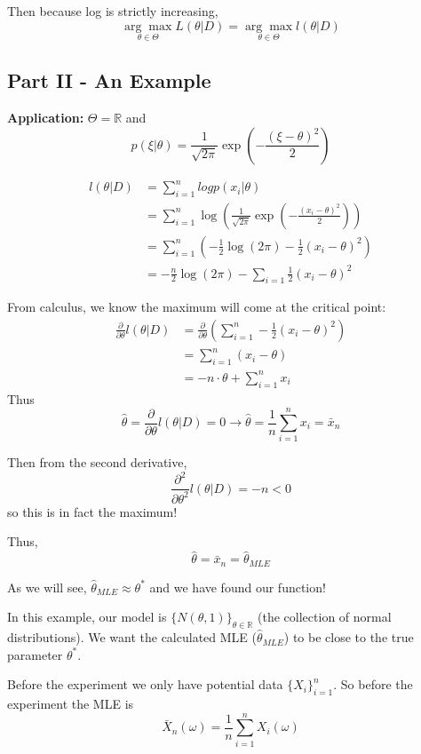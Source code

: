 \documentclass[12pt]{article}
\newcommand{\R}{\mathbb{R}}
\begin{document}
Then because log is strictly increasing, 
\[\underset{\theta \in \Theta}{\arg \max} L(\theta | D) = \underset{\theta \in \Theta}{\arg \max} l(\theta | D)\]

\subsection*{Part II - An Example}
\textbf{Application:} $\Theta = \R$ and 
\[p(\xi | \theta) = \frac{1}{\sqrt{2\pi}} \exp(- \frac{(\xi - \theta)^2}{2})\]

\begin{align*}
    l(\theta | D) &= \sum_{i=1}^n log p(x_i | \theta)\\
    &= \sum_{i=1}^n \log\left(\frac{1}{\sqrt{2\pi}} \exp(- \frac{(x_i - \theta)^2}{2})\right)\\
    &= \sum_{i=1}^n \left(-\frac{1}{2}\log(2\pi) - \frac{1}{2}(x_i - \theta)^2\right)\\
    &= -\frac{n}{2}\log(2\pi) - \sum_{i=1}\frac{1}{2}(x_i - \theta)^2
\end{align*}

From calculus, we know the maximum will come at the critical point: 
\begin{align*}
    \frac{\partial}{\partial \theta} l(\theta | D) &= \frac{\partial}{\partial \theta} \left(\sum_{i=1}^n -\frac{1}{2}(x_i - \theta)^2\right)\\
    &= \sum_{i=1}^n (x_i - \theta)\\
    &= -n \cdot \theta + \sum_{i=1}^n x_i
\end{align*}
Thus 
\[\hat \theta =  \frac{\partial}{\partial \theta} l(\theta | D) = 0 \longrightarrow \hat \theta = \frac{1}{n}\sum_{i=1}^n x_i = \bar{x}_n\]

Then from the second derivative, 
\[\frac{\partial^2}{\partial \theta^2} l(\theta | D) = -n < 0\]
so this is in fact the maximum!

Thus,
\[\hat \theta = \bar{x}_n = \hat \theta_{MLE}\]

As we will see, $\hat \theta_{MLE} \approx \theta^*$ and we have found our function!

In this example, our model is $\{N(\theta, 1)\}_{\theta \in \R}$ (the collection of normal distributions). We want the calculated MLE ($\hat \theta_{MLE}$) to be close to the true parameter $\theta^*$. 

Before the experiment we only have potential data $\{X_i\}_{i=1}^n$. So before the experiment the MLE is 
\[\bar X_n(\omega) = \frac{1}{n} \sum_{i=1}^n X_i(\omega)\]
\end{document}
